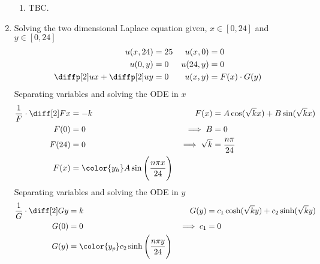 \begin{enumerate}
\begin{enumerate}
              \item TBC.
          \end{enumerate}

    \item Solving the two dimensional Laplace equation given, $ x \in [0, 24] $ and
          $ y \in [0, 24] $
          \begin{align}
              u(x, 24)                   & = 25              &
              u(x, 0)                    & = 0                 \\
              u(0, y)                    & = 0               &
              u(24, y)                   & = 0                 \\
              \diffp[2] ux +\diffp[2] uy & = 0               &
              u(x, y)                    & = F(x) \cdot G(y)
          \end{align}
          Separating variables and solving the ODE in $ x $
          \begin{align}
              \frac{1}{F} \cdot \diff[2] Fx & = -k                                  &
              F(x)                          & = A\cos(\sqrt{k}x) + B\sin(\sqrt{k}x)   \\
              F(0)                          & = 0                                   &
              \implies B                    & = 0                                     \\
              F(24)                         & = 0                                   &
              \implies \sqrt{k}             & = \frac{n\pi}{24}                       \\
              F(x)                          & = \color{y_h} A\sin\Bigg(
              \frac{n\pi x}{24} \Bigg)
          \end{align}
          Separating variables and solving the ODE in $ y $
          \begin{align}
              \frac{1}{G} \cdot \diff[2] Gy & = k                           &
              G(y)                          & = c_1 \cosh(\sqrt{k}y)
              + c_2\sinh(\sqrt{k}y)                                           \\
              G(0)                          & = 0                           &
              \implies c_1                  & = 0                             \\
              G(y)                          & = \color{y_p} c_2 \sinh\Bigg(
              \frac{n\pi y}{24}\Bigg)
          \end{align}

\end{enumerate}
